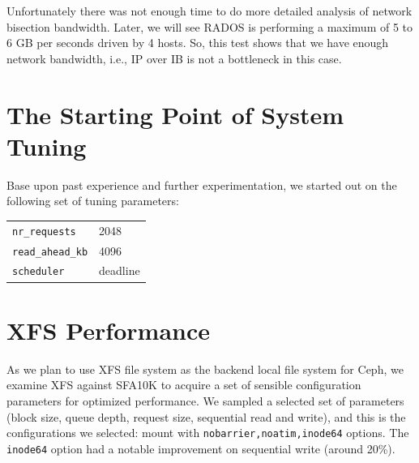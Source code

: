 \documentclass{article}
\begin{document}
Unfortunately there was not enough time to do more detailed analysis of network
bisection bandwidth. Later, we will see RADOS is performing a
maximum of 5 to 6 GB per seconds driven by 4 hosts.  So, this test shows that we
have enough network bandwidth, i.e., IP over IB is not a bottleneck in this
case.




\section{The Starting Point of System Tuning}

Base upon past experience and further experimentation, we started out on the
following set of tuning parameters:

\begin{table}[htb]
\centering
\begin{tabular}{ll}
    \toprule
    \verb!nr_requests! & 2048 \\
    \verb!read_ahead_kb! & 4096 \\
    \verb!scheduler! & deadline \\
    \bottomrule
\end{tabular}

\end{table}



\section{XFS Performance}

As we plan to use XFS file system as the backend local file system for Ceph, we
examine XFS against SFA10K to acquire a set of sensible configuration parameters
for optimized performance. We sampled a selected set of parameters (block size,
queue depth, request size, sequential read and write), and this is the
configurations we selected: mount with \verb!nobarrier,noatim,inode64! options.
The \verb!inode64! option had a notable improvement on sequential write (around
20\%).
\end{document}
